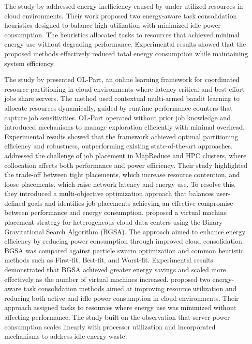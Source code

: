 The study by \cite{Lee2012} addressed energy inefficiency caused by under-utilized resources in cloud environments. Their work proposed two energy-aware task consolidation heuristics designed to balance high utilization with minimized idle power consumption. The heuristics allocated tasks to resources that achieved minimal energy use without degrading performance. Experimental results showed that the proposed methods effectively reduced total energy consumption while maintaining system efficiency.

The study by \cite{Chen_2023_9beb} presented OL-Part, an online learning framework for coordinated resource partitioning in cloud environments where latency-critical and best-effort jobs share servers. The method used contextual multi-armed bandit learning to allocate resources dynamically, guided by runtime performance counters that capture job sensitivities. OL-Part operated without prior job knowledge and introduced mechanisms to manage exploration efficiently with minimal overhead. Experimental results showed that the framework achieved optimal partitioning efficiency and robustness, outperforming existing state-of-the-art approaches.
\cite{Blagodurov_2015} addressed the challenge of job placement in MapReduce and HPC clusters, where collocation affects both performance and power efficiency. Their study highlighted the trade-off between tight placements, which increase resource contention, and loose placements, which raise network latency and energy use. To resolve this, they introduced a multi-objective optimization approach that balances user-defined goals and identifies job placements achieving an effective compromise between performance and energy consumption.
\cite{abdessamia2020energy} proposed a virtual machine placement strategy for heterogeneous cloud data centers using the Binary Gravitational Search Algorithm (BGSA). The approach aimed to enhance energy efficiency by reducing power consumption through improved cloud consolidation. BGSA was compared against particle swarm optimization and common heuristic methods such as First-fit, Best-fit, and Worst-fit. Experimental results demonstrated that BGSA achieved greater energy savings and scaled more effectively as the number of virtual machines increased.
\cite{10.1007/978-3-031-23092-9_35} proposed two energy-aware task consolidation methods aimed at improving resource utilization and reducing both active and idle power consumption in cloud environments. Their approach assigned tasks to resources where energy use was minimized without affecting performance. The study built on the observation that server power consumption scales linearly with processor utilization and incorporated mechanisms to address idle energy waste.

